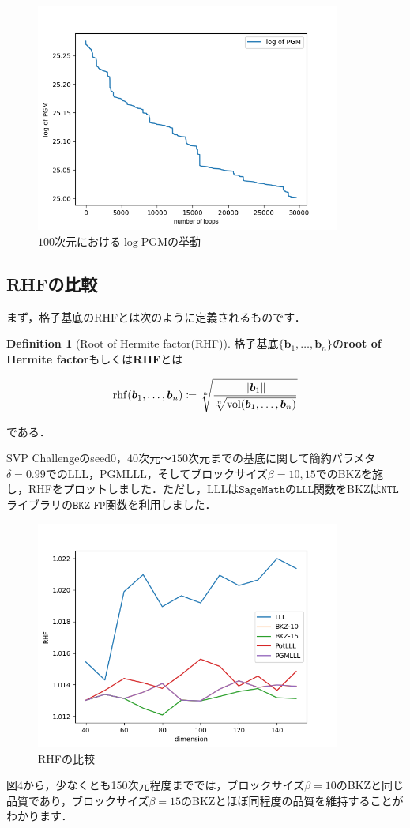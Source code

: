 \documentclass[a4j, dvipdfmx]{jsarticle}
\theoremstyle{definition}
\newtheorem{definition}{Definition}[section]
\begin{document}
\begin{figure}[H]
    \includegraphics[width=100mm]{100.png}
    \caption{$100$次元における$\log \mathrm{PGM}$の挙動}
\end{figure}



\subsection{RHFの比較}
まず，格子基底のRHFとは次のように定義されるものです．

\begin{definition}[Root of Hermite factor(RHF)]
    格子基底$\{\boldsymbol{b}_1,\ldots,\boldsymbol{b}_n\}$の\textbf{root of Hermite factor}もしくは\textbf{RHF}とは
    
    $$
    \mathrm{rhf}(\boldsymbol{b}_1,\ldots,\boldsymbol{b}_n)\coloneqq \sqrt[n]{\frac{\norm{\boldsymbol{b}_1}}{\sqrt[n]{\mathrm{vol}(\boldsymbol{b}_1,\ldots,\boldsymbol{b}_n)}}}
    $$
    
    である．
\end{definition}

SVP Challengeのseed0，$40$次元～$150$次元までの基底に関して簡約パラメタ$\delta=0.99$でのLLL，PGMLLL，そしてブロックサイズ$\beta=10, 15$でのBKZを施し，RHFをプロットしました．ただし，LLLは$\texttt{SageMath}$の$\texttt{LLL}$関数をBKZは$\texttt{NTL}$ライブラリの$\texttt{BKZ\_FP}$関数を利用しました．

\begin{figure}[H]
    \includegraphics[width=100mm]{RHF40-150.png}
    \caption{RHFの比較}
\end{figure}


図4から，少なくとも150次元程度まででは，ブロックサイズ$\beta=10$のBKZと同じ品質であり，ブロックサイズ$\beta=15$のBKZとほぼ同程度の品質を維持することがわかります．
\end{document}
